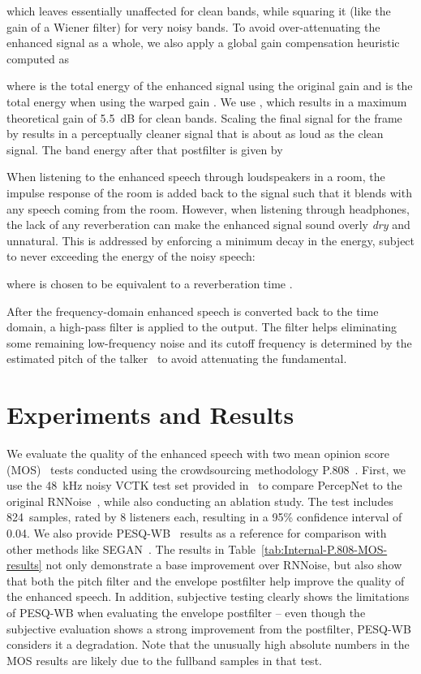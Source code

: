 \documentclass[english]{article}
\begin{document}
which leaves  essentially unaffected for clean bands,
while squaring it (like the gain of a Wiener filter) for very noisy
bands. To avoid over-attenuating the enhanced signal as a whole, we
also apply a global gain compensation heuristic computed as

where  is the total energy of the enhanced signal using the
original gain  and  is the total energy when
using the warped gain . We use ,
which results in a maximum theoretical gain of 5.5~dB for clean bands.
Scaling the final signal for the frame by  results in a perceptually
cleaner signal that is about as loud as the clean signal. The band
energy after that postfilter is given by



When listening to the enhanced speech through loudspeakers in a room,
the impulse response of the room is added back to the signal such
that it blends with any speech coming from the room. However, when
listening through headphones, the lack of any reverberation can make
the enhanced signal sound overly \emph{dry} and unnatural. This is
addressed by enforcing a minimum decay in the energy, subject to never
exceeding the energy of the noisy speech:

where  is chosen to be equivalent to a reverberation time
.

After the frequency-domain enhanced speech is converted back to the
time domain, a high-pass filter is applied to the output. The filter
helps eliminating some remaining low-frequency noise and its cutoff
frequency is determined by the estimated pitch of the talker~\cite{vos2013}
to avoid attenuating the fundamental. 


\section{Experiments and Results}

\label{sec:results}

We evaluate the quality of the enhanced speech with two mean opinion
score (MOS)~\cite{P.800} tests conducted using the crowdsourcing
methodology P.808~\cite{P.808}. First, we use the 48~kHz noisy
VCTK test set provided in~\cite{valentini2016investigating} to compare
PercepNet to the original RNNoise~\cite{valin2018rnnoise}, while
also conducting an ablation study. The test includes 824~samples,
rated by 8 listeners each, resulting in a 95\% confidence interval
of 0.04. We also provide PESQ-WB~\cite{P.862.2} results as a reference
for comparison with other methods like SEGAN~\cite{pascual2017segan}.
The results in Table~\ref{tab:Internal-P.808-MOS-results} not only
demonstrate a base improvement over RNNoise, but also show that both
the pitch filter and the envelope postfilter help improve the quality
of the enhanced speech. In addition, subjective testing clearly shows
the limitations of PESQ-WB when evaluating the envelope postfilter
-- even though the subjective evaluation shows a strong improvement
from the postfilter, PESQ-WB considers it a degradation. Note that
the unusually high absolute numbers in the MOS results are likely
due to the fullband samples in that test.
\end{document}
